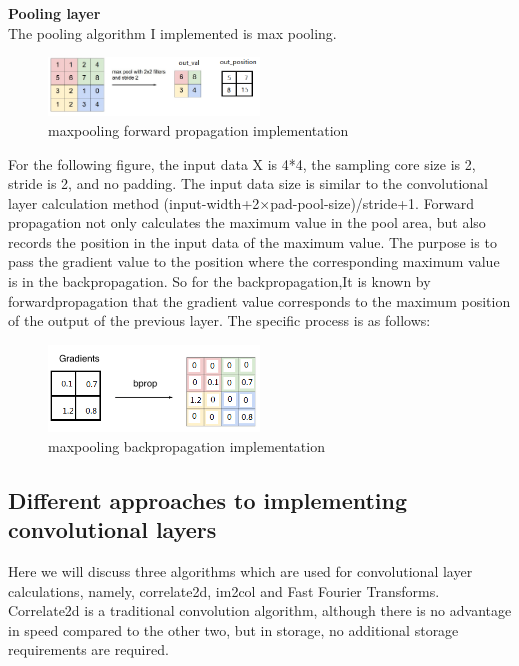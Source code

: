 \documentclass{article}
\begin{document}
\textbf{Pooling layer}\\
The pooling algorithm I implemented is max pooling.
\begin{figure}[H] %
	\centering %
	\includegraphics[width=0.5\textwidth]{./pic/part1/mpImpfprop.png} %
	\caption{maxpooling forward propagation implementation} %
	\label{Fig.main2} %
\end{figure}
For the following figure, the input data X is 4*4, the sampling core size is 2, stride is 2, and no padding. The input data size is similar to the convolutional layer calculation method (input-width+2$\times$pad-pool-size)/stride+1. Forward propagation not only calculates the maximum value in the pool area, but also records the position in the input data of the maximum value. The purpose is to pass the gradient value to the position where the corresponding maximum value is in the backpropagation.
So for the backpropagation,It is known by forwardpropagation that the gradient value corresponds to the maximum position of the output of the previous layer. The specific process is as follows:
\begin{figure}[H] %
	\centering %
	\includegraphics[width=0.5\textwidth]{./pic/part1/mpImpBprop.png} %
	\caption{maxpooling backpropagation implementation} %
	\label{Fig.main2} %
\end{figure}
\subsection{Different approaches to implementing convolutional layers}
Here we will discuss three algorithms which are used for convolutional layer calculations, namely, correlate2d, im2col and Fast Fourier Transforms.
Correlate2d is a traditional convolution algorithm, although there is no advantage in speed compared to the other two, but in storage, no additional storage requirements are required.
\end{document}
